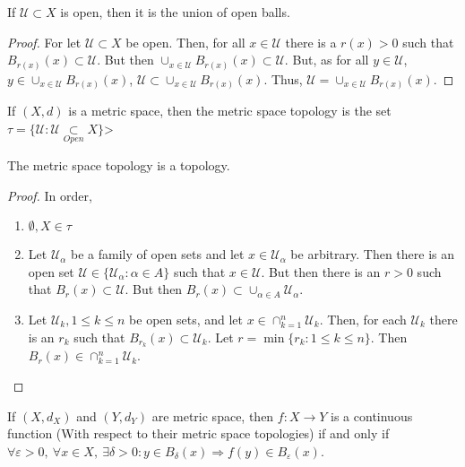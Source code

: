             \begin{theorem}
            If $\mathcal{U}\subset X$ is open, then it is the union of open balls.
            \end{theorem}
            \begin{proof}
            For let $\mathcal{U} \subset X$ be open. Then, for all $x\in \mathcal{U}$ there is a $r(x)>0$ such that $B_{r(x)}(x) \subset \mathcal{U}$. But then $\cup_{x\in \mathcal{U}}B_{r(x)}(x)\subset \mathcal{U}$. But, as for all $y\in \mathcal{U}$, $y\in \cup_{x\in \mathcal{U}}B_{r(x)}(x)$, $\mathcal{U} \subset \cup_{x\in \mathcal{U}}B_{r(x)}(x)$. Thus, $\mathcal{U}= \cup_{x\in \mathcal{U}}B_{r(x)}(x)$.
            \end{proof}
            \begin{definition}
            If $(X,d)$ is a metric space, then the metric space topology is the set $\tau = \{\mathcal{U}:\mathcal{U}\underset{Open}\subset X\}$>
            \end{definition}
            \begin{theorem}
            The metric space topology is a topology.
            \end{theorem}
            \begin{proof}
            In order,
            \begin{enumerate}
            \item $\emptyset, X \in \tau$
            \item Let $\mathcal{U}_{\alpha}$ be a family of open sets and let $x\in \mathcal{U}_{\alpha}$ be arbitrary. Then there is an open set $\mathcal{U} \in \{\mathcal{U}_{\alpha}:\alpha\in A\}$ such that $x\in \mathcal{U}$. But then there is an $r>0$ such that $B_{r}(x)\subset\mathcal{U}$. But then $B_{r}(x) \subset \cup_{\alpha \in A}\mathcal{U}_{\alpha}$.
            \item Let $\mathcal{U}_{k}, 1\leq k \leq n$ be open sets, and let $x\in \cap_{k=1}^{n} \mathcal{U}_k$. Then, for each $\mathcal{U}_k$ there is an $r_{k}$ such that $B_{r_k}(x)\subset \mathcal{U}_{k}$. Let $r = \min\{r_k:1\leq k \leq n\}$. Then $B_{r}(x) \in \cap_{k=1}^{n}\mathcal{U}_k$.
            \end{enumerate}
            \end{proof}
            \begin{theorem}
            If $(X,d_X)$ and $(Y,d_Y)$ are metric space, then $f:X\rightarrow Y$ is a continuous function (With respect to their metric space topologies) if and only if $\forall \varepsilon>0,\ \forall x\in X,\ \exists \delta>0:y\in B_{\delta}(x)\Rightarrow f(y) \in B_{\varepsilon}(x)$.
            \end{theorem}
